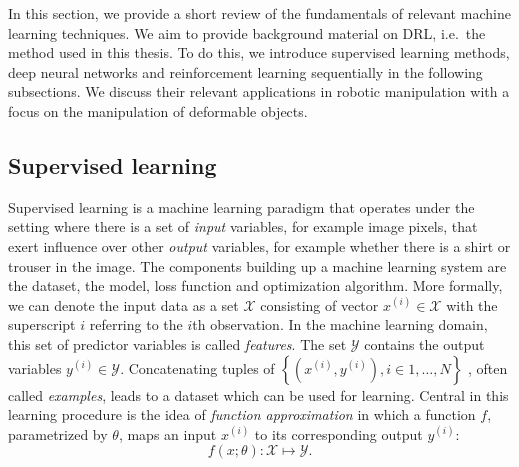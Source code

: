 \documentclass[\home/main.tex]{subfiles}
\begin{document}
In this section, we provide a short review of the fundamentals of relevant machine learning techniques. We aim to provide background material on \gls{DRL}, i.e.\ the method used in this thesis. To do this, we introduce supervised learning methods, deep neural networks and reinforcement learning sequentially in the following subsections. We discuss their relevant applications in robotic manipulation with a focus on the manipulation of deformable objects. %

\subsection{Supervised learning} \label{subsec:lit_sl}

Supervised learning is a machine learning paradigm that operates under the setting where there is a set of \textit{input} variables, for example image pixels, that exert influence over other \textit{output} variables, for example whether there is a shirt or trouser in the image.
The components building up a machine learning system are the dataset, the model, loss function and optimization algorithm.
More formally, we can denote the input data as a set $\mathcal{X}$ consisting of vector $x^{(i)} \in \mathcal{X} $ with the superscript $i$ referring to the $i$th observation. In the machine learning domain, this set of predictor variables is called \textit{features}. The set $\mathcal{Y}$ contains the output variables $y^{(i)} \in \mathcal{Y}$. Concatenating tuples of
$\left\{\left(x^{(i)}, y^{(i)}\right) , i \in 1,\dots,N \right\}$
, often called \textit{examples}, leads to a dataset which can be used for learning. Central in this learning procedure is the idea of \textit{function approximation} in which a function $f$, parametrized by $\theta$, maps an input $x^{(i)}$ to its corresponding output $y^{(i)}$:
\begin{equation*}
	f(x;\theta): \mathcal{X} \mapsto \mathcal{Y}\text{.}
\end{equation*}
\end{document}
